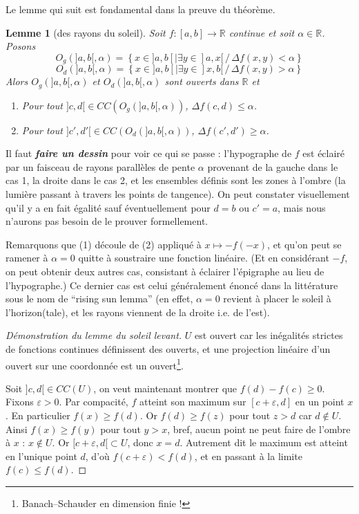 \documentclass[a4paper, 11pt]{article}
\def\R{\mathbb{R}}
\newtheorem*{lemma}{Lemme}
\begin{document}
Le lemme qui suit est fondamental dans la preuve du théorème.

\begin{lemma}[des rayons du soleil]
  Soit $f : [a,b] \to \R$ continue et soit $\alpha \in \R$. Posons
  \[ O_g(]a,b[,\alpha)  = \left\{ x \in ]a,b[ | \exists y \in ]a,x[\,/\,
      \Delta f(x,y) < \alpha \right\} \]
  \[ O_d(]a,b[,\alpha) = \left\{ x \in ]a,b[ | \exists y \in ]x,b[\,/\,
      \Delta f(x,y) > \alpha \right\}
  \]
  Alors $O_g(]a,b[,\alpha)$ et $O_d(]a,b[,\alpha)$ sont ouverts dans $\R$ et
  \begin{enumerate}
  \item Pour tout $]c,d[ \in CC(O_g(]a,b[,\alpha))$,
    $\displaystyle \Delta f(c,d) \leq \alpha$.
  \item Pour tout $]c',d'[ \in CC(O_d(]a,b[,\alpha))$,
    $\displaystyle \Delta f(c',d') \geq \alpha$.
  \end{enumerate}
\end{lemma}
Il faut \textit{\textbf{faire un dessin}} pour voir ce qui se passe :
l'hypographe de $f$ est éclairé par un faisceau de rayons parallèles de pente
$\alpha$ provenant de la gauche dans le cas 1, la droite dans le cas 2, et les
ensembles définis sont les zones à l'ombre (la lumière passant à travers les
points de tangence). On peut constater visuellement qu'il y a en fait égalité
sauf éventuellement pour $d = b$ ou $c' = a$, mais nous n'aurons pas besoin de
le prouver formellement.

Remarquons que (1) découle de (2) appliqué à $x \mapsto -f(-x)$, et qu'on peut
se ramener à $\alpha = 0$ quitte à soustraire une fonction linéaire. (Et en
considérant $-f$, on peut obtenir deux autres cas, consistant à éclairer
l'épigraphe au lieu de l'hypographe.) Ce dernier cas est celui généralement
énoncé dans la littérature sous le nom de \enquote{rising sun lemma} (en effet,
$\alpha = 0$ revient à placer le soleil à l'horizon(tale), et les rayons
viennent de la droite i.e. de l'est).

\begin{proof}[Démonstration du lemme du soleil levant]
  $U$ est ouvert car les inégalités strictes de fonctions continues définissent
  des ouverts, et une projection linéaire d'un ouvert sur une coordonnée
  est un ouvert\footnote{Banach--Schauder en dimension finie !}.

  Soit $]c,d[ \in CC(U)$, on veut maintenant montrer que $f(d) - f(c) \geq 0$.
  Fixons $\varepsilon > 0$. Par compacité, $f$ atteint son maximum sur
  $[c+\varepsilon, d]$ en un point $x$. En particulier $f(x) \geq f(d)$. Or
  $f(d) \geq f(z)$ pour tout $z > d$ car $d \not\in U$. Ainsi $f(x) \geq f(y)$
  pour tout $y > x$, bref, aucun point ne peut faire de l'ombre à $x$ : $x
  \not\in U$. Or $[c+\varepsilon,d[ \subset U$, donc $x = d$. Autrement dit le
  maximum est atteint en l'unique point $d$, d'où $f(c+\varepsilon) < f(d)$, et
  en passant à la limite $f(c) \leq f(d)$.
\end{proof}
\end{document}

